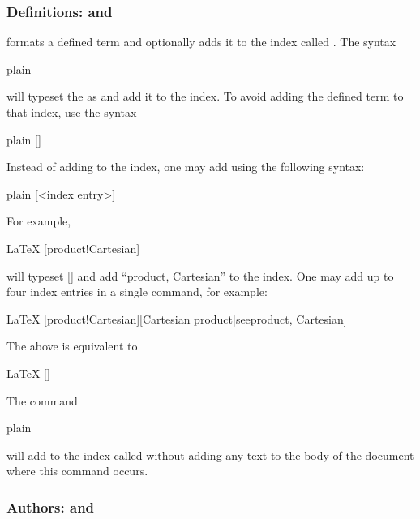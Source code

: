 \subsubsection{Definitions:  and \code{\\generalindexentry}}

 formats a defined term and optionally adds it to the index called . The syntax
\begin{snippet}{plain}
\end{snippet}
will typeset the  as  and add it to the  index. To avoid adding the defined term to that index, use the syntax
\begin{snippet}{plain}
[]
\end{snippet}
Instead of adding  to the  index, one may add  using the following syntax:
\begin{snippet}{plain}
[<index entry>]
\end{snippet}
For example,
\begin{snippet}{LaTeX}
[product!Cartesian]
\end{snippet}
will typeset [] and add ``product, Cartesian'' to the  index. One may add up to four index entries in a single  command, for example:
\begin{snippet}{LaTeX}
[product!Cartesian][Cartesian product|see{product, Cartesian}]
\end{snippet}
The above is equivalent to
\begin{snippet}{LaTeX}
[]
\end{snippet}
The command
\begin{snippet}{plain}
\end{snippet}
will add  to the index called  without adding any text to the body of the document where this command occurs.

\subsubsection{Authors: \code{\\anauthor} and \code{\\authorsindexentry}}

